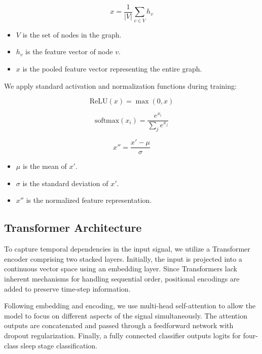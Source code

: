 \begin{equation}
	x = \frac{1}{|V|} \sum_{v \in V} h_v
\end{equation}

\begin{itemize}
	\item $V$ is the set of nodes in the graph.
	\item $h_v$ is the feature vector of node $v$.
	\item $x$ is the pooled feature vector representing the entire graph.
\end{itemize}

We apply standard activation and normalization functions during training:

\begin{equation}
	\text{ReLU}(x) = \max(0, x)
\end{equation}

\begin{equation}
	\text{softmax}(x_i) = \frac{e^{x_i}}{\sum_j e^{x_j}}
\end{equation}

\begin{equation}
	x'' = \frac{x' - \mu}{\sigma}
\end{equation}

\begin{itemize}
	\item $\mu$ is the mean of $x'$.
	\item $\sigma$ is the standard deviation of $x'$.
	\item $x''$ is the normalized feature representation.
\end{itemize}


\subsection{Transformer Architecture}

To capture temporal dependencies in the input signal, we utilize a Transformer encoder comprising two stacked layers. Initially, the input is projected into a continuous vector space using an embedding layer. Since Transformers lack inherent mechanisms for handling sequential order, positional encodings are added to preserve time-step information. 

Following embedding and encoding, we use multi-head self-attention to allow the model to focus on different aspects of the signal simultaneously. The attention outputs are concatenated and passed through a feedforward network with dropout regularization. Finally, a fully connected classifier outputs logits for four-class sleep stage classification.

